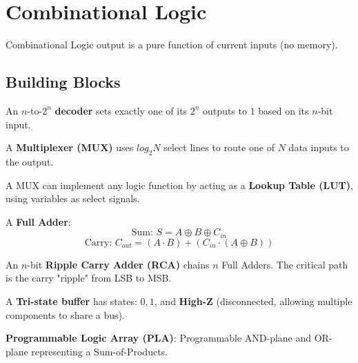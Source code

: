 \section{Combinational Logic}

\begin{definition}
Combinational Logic output is a pure function of current inputs (no memory).
\end{definition}

\subsection{Building Blocks}

\begin{definition}
An $n$-to-$2^n$ \textbf{decoder} sets exactly one of its $2^n$ outputs to $1$ based on its $n$-bit input.
\end{definition}

\begin{definition}
A \textbf{Multiplexer (MUX)} uses $log_2 N$ select lines to route one of $N$ data inputs to the output.
\end{definition}

\begin{example}
A MUX can implement any logic function by acting as a \textbf{Lookup Table (LUT)}, using variables as select signals.
\end{example}

\begin{definition}
A \textbf{Full Adder}:
$$\text{Sum: } S = A \oplus B \oplus C_{in}$$
$$\text{Carry: } C_{out} = (A \cdot B) + (C_{in} \cdot (A \oplus B))$$
\end{definition}

\begin{important}
An $n$-bit \textbf{Ripple Carry Adder (RCA)} chains $n$ Full Adders. The critical path is the carry "ripple" from LSB to MSB.
\end{important}

\begin{lemma}
A \textbf{Tri-state buffer} has states: $0, 1$, and \textbf{High-Z} (disconnected, allowing multiple components to share a bus).
\end{lemma}

\begin{example}
\textbf{Programmable Logic Array (PLA)}: Programmable AND-plane and OR-plane representing a Sum-of-Products.
\end{example}
